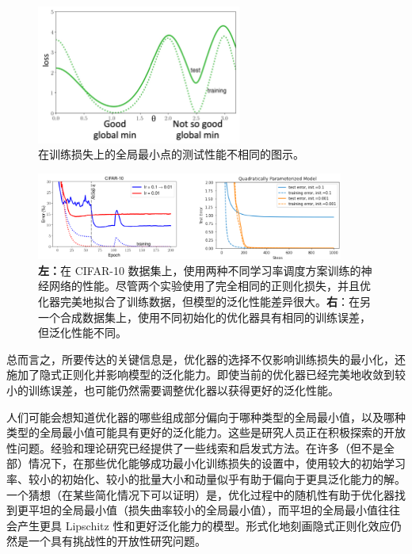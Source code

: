 \begin{figure}[H]
    \centering
    \includegraphics[width=0.6\textwidth]{figs/global_minima.png}
    \caption{在训练损失上的全局最小点的测试性能不相同的图示。}
    \label{fig:9.1}
\end{figure}

\begin{figure}[H]
    \centering
    \includegraphics[width=0.9\textwidth]{figs/global_minima_nn.png}
    \caption{\textbf{左：}在 CIFAR-10 数据集上，使用两种不同学习率调度方案训练的神经网络的性能。尽管两个实验使用了完全相同的正则化损失，并且优化器完美地拟合了训练数据，但模型的泛化性能差异很大。\textbf{右}：在另一个合成数据集上，使用不同初始化的优化器具有相同的训练误差，但泛化性能不同。\protect\footnotemark}
\end{figure}

总而言之，所要传达的关键信息是，优化器的选择不仅影响训练损失的最小化，还施加了隐式正则化并影响模型的泛化能力。即使当前的优化器已经完美地收敛到较小的训练误差，也可能仍然需要调整优化器以获得更好的泛化性能。

人们可能会想知道优化器的哪些组成部分偏向于哪种类型的全局最小值，以及哪种类型的全局最小值可能具有更好的泛化能力。这些是研究人员正在积极探索的开放性问题。经验和理论研究已经提供了一些线索和启发式方法。在许多（但不是全部）情况下，在那些优化能够成功最小化训练损失的设置中，使用较大的初始学习率、较小的初始化、较小的批量大小和动量似乎有助于偏向于更具泛化能力的解。一个猜想（在某些简化情况下可以证明）是，优化过程中的随机性有助于优化器找到更平坦的全局最小值（损失曲率较小的全局最小值），而平坦的全局最小值往往会产生更具 Lipschitz 性和更好泛化能力的模型。形式化地刻画隐式正则化效应仍然是一个具有挑战性的开放性研究问题。

